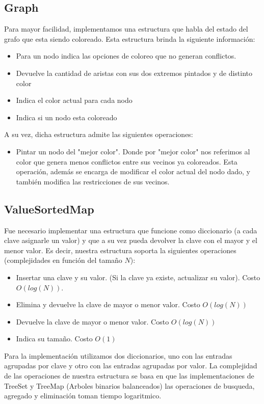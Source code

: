 \subsection{Graph}

Para mayor facilidad, implementamos una estructura que habla del estado del grafo que esta siendo coloreado. Esta estructura brinda la siguiente información:
\begin{itemize}
\item Para un nodo indica las opciones de coloreo que no generan conflictos.
\item Devuelve la cantidad de aristas con sus dos extremos pintados y de distinto color
\item Indica el color actual para cada nodo
\item Indica si un nodo esta coloreado
\end{itemize}

A su vez, dicha estructura admite las siguientes operaciones:
\begin{itemize}
\item Pintar un nodo del "mejor color". Donde por "mejor color" nos referimos al color que genera menos conflictos entre sus vecinos ya coloreados. Esta operación, además se encarga de modificar el color actual del nodo dado, y también modifica las restricciones de sus vecinos.
\end{itemize}	

\subsection{ValueSortedMap}
Fue necesario implementar una estructura que funcione como diccionario (a cada clave asignarle un valor) y que a su vez pueda devolver la clave con el mayor y el menor valor. Es decir, nuestra estructura soporta la siguientes operaciones (complejidades en función del tamaño $N$):
\begin{itemize}
\item Insertar una clave y su valor. (Si la clave ya existe, actualizar su valor). Costo $O(log(N))$.
\item Elimina y devuelve la clave de mayor o menor valor. Costo $O(log(N))$
\item Devuelve la clave de mayor o menor valor. Costo $O(log(N))$
\item Indica su tamaño. Costo $O(1)$
\end{itemize}

Para la implementación utilizamos dos diccionarios, uno con las entradas agrupadas por clave y otro con las entradas agrupadas por valor. La complejidad de las operaciones de nuestra estructura se basa en que las implementaciones de TreeSet y TreeMap (Arboles binarios balanceados) las operaciones de busqueda, agregado y eliminación toman tiempo logaritmico.
	 